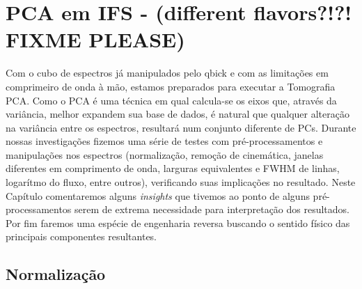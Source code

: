 



\chapter{PCA em IFS - (different flavors?!?! FIXME PLEASE)}
\label{sec:UsoPCA}

\fixme Com o cubo de espectros já manipulados pelo {\sc qbick} e com as limitações em comprimeiro de onda à mão, estamos
preparados para executar a Tomografia PCA. Como o PCA é uma técnica em qual calcula-se os eixos que, através da
variância, melhor expandem sua base de dados, é natural que qualquer alteração na variância entre os espectros,
resultará num conjunto diferente de PCs. Durante nossas investigações fizemos uma série de testes com pré-processamentos
e manipulações nos espectros (normalização, remoção de cinemática, janelas diferentes em comprimento de onda, larguras
equivalentes e FWHM de linhas, logarítmo do fluxo, entre outros), verificando suas implicações no resultado. Neste
Capítulo comentaremos alguns {\em insights} que tivemos ao ponto de alguns pré-processamentos serem de extrema
necessidade para interpretação dos resultados. Por fim faremos uma espécie de engenharia reversa buscando o sentido
físico das principais componentes resultantes.

\section{Normalização}
\label{sec:UsoPCA:norm}

